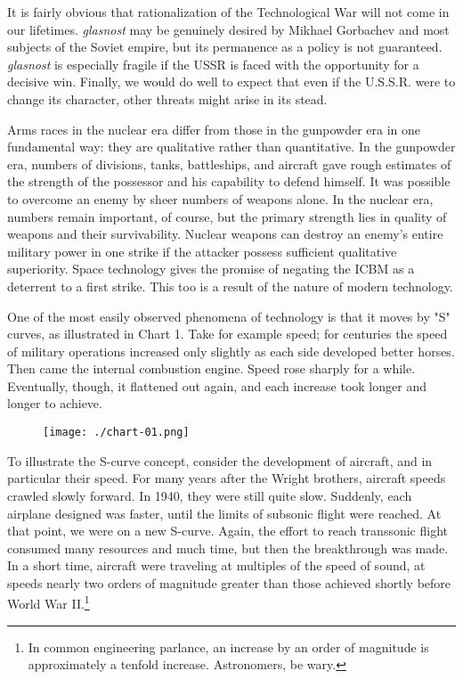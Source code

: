 It is fairly obvious that rationalization of the Technological War will not come in our lifetimes. \textit{glasnost} may be genuinely desired by Mikhael Gorbachev and most subjects of the Soviet empire, but its permanence as a policy is not guaranteed. \textit{glasnost} is especially fragile if the USSR is faced with the opportunity for a decisive win. Finally, we would do well to expect that even if the U.S.S.R. were to change its character, other threats might arise in its stead.

Arms races in the nuclear era differ from those in the gunpowder era in one fundamental way: they are qualitative rather than quantitative. In the gunpowder era, numbers of divisions, tanks, battleships, and aircraft gave rough estimates of the strength of the possessor and his capability to defend himself. It was possible to overcome an enemy by sheer numbers of weapons alone. In the nuclear era, numbers remain important, of course, but the primary strength lies in quality of weapons and their survivability. Nuclear weapons can destroy an enemy's entire military power in one strike if the attacker possess sufficient qualitative superiority. Space technology gives the promise of negating the ICBM as a deterrent to a first strike. This too is a result of the nature of modern technology.

One of the most easily observed phenomena of technology is that it moves by "S" curves, as illustrated in Chart 1. Take for example speed; for centuries the speed of military operations increased only slightly as each side developed better horses. Then came the internal combustion engine. Speed rose sharply for a while. Eventually, though, it flattened out again, and each increase took longer and longer to achieve.
\begin{figure}[h!]
    \texttt{[image: ./chart-01.png]}
    \label{fig:S-Curve}
\end{figure}

To illustrate the S-curve concept, consider the development of aircraft, and in particular their speed. For many years after the Wright brothers, aircraft speeds crawled slowly forward. In 1940, they were still quite slow. Suddenly, each airplane designed was faster, until the limits of subsonic flight were reached. At that point, we were on a new S-curve. Again, the effort to reach transsonic flight consumed many resources and much time, but then the breakthrough was made. In a short time, aircraft were traveling at multiples of the speed of sound, at speeds nearly two orders of magnitude greater than those achieved shortly before World War II.\footnote{In common engineering parlance, an increase by an order of magnitude is approximately a tenfold increase. Astronomers, be wary.}

